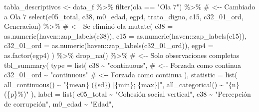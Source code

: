 \documentclass[
  spanish,
  a4paper,
  oneside]{scrbook}
\newenvironment{Shaded}{\begin{snugshade}}{\end{snugshade}}
\newcommand{\AttributeTok}[1]{\textcolor[rgb]{0.40,0.45,0.13}{#1}}
\newcommand{\CommentTok}[1]{\textcolor[rgb]{0.37,0.37,0.37}{#1}}
\newcommand{\FunctionTok}[1]{\textcolor[rgb]{0.28,0.35,0.67}{#1}}
\newcommand{\NormalTok}[1]{\textcolor[rgb]{0.00,0.23,0.31}{#1}}
\newcommand{\OtherTok}[1]{\textcolor[rgb]{0.00,0.23,0.31}{#1}}
\newcommand{\SpecialCharTok}[1]{\textcolor[rgb]{0.37,0.37,0.37}{#1}}
\newcommand{\StringTok}[1]{\textcolor[rgb]{0.13,0.47,0.30}{#1}}
\begin{document}
\begin{Shaded}
\begin{Highlighting}[]
\NormalTok{tabla\_descriptivos }\OtherTok{\textless{}{-}}\NormalTok{ data\_f }\SpecialCharTok{\%\textgreater{}\%} 
  \FunctionTok{filter}\NormalTok{(ola }\SpecialCharTok{==} \StringTok{"Ola 7"}\NormalTok{) }\SpecialCharTok{\%\textgreater{}\%}               \CommentTok{\# \textless{}{-}{-} Cambiado a Ola 7}
  \FunctionTok{select}\NormalTok{(c05\_total, c38, m0\_edad, egp4, trato\_digno,}
\NormalTok{         c15, c32\_01\_ord, Generacion) }\SpecialCharTok{\%\textgreater{}\%}  \CommentTok{\# \textless{}{-}{-} Se eliminó \textquotesingle{}ola\textquotesingle{}}
  \FunctionTok{mutate}\NormalTok{(}
    \AttributeTok{c38        =} \FunctionTok{as.numeric}\NormalTok{(haven}\SpecialCharTok{::}\FunctionTok{zap\_labels}\NormalTok{(c38)),}
    \AttributeTok{c15        =} \FunctionTok{as.numeric}\NormalTok{(haven}\SpecialCharTok{::}\FunctionTok{zap\_labels}\NormalTok{(c15)),}
    \AttributeTok{c32\_01\_ord =} \FunctionTok{as.numeric}\NormalTok{(haven}\SpecialCharTok{::}\FunctionTok{zap\_labels}\NormalTok{(c32\_01\_ord)),}
    \AttributeTok{egp4       =} \FunctionTok{as.factor}\NormalTok{(egp4)}
\NormalTok{  ) }\SpecialCharTok{\%\textgreater{}\%} 
  \FunctionTok{drop\_na}\NormalTok{() }\SpecialCharTok{\%\textgreater{}\%}                            \CommentTok{\# \textless{}{-}{-} Solo observaciones completas}
  \FunctionTok{tbl\_summary}\NormalTok{(}
    \AttributeTok{type =} \FunctionTok{list}\NormalTok{(}
\NormalTok{      c38        }\SpecialCharTok{\textasciitilde{}} \StringTok{"continuous"}\NormalTok{,           }\CommentTok{\# \textless{}{-}{-} Forzada como continua}
\NormalTok{      c32\_01\_ord }\SpecialCharTok{\textasciitilde{}} \StringTok{"continuous"}            \CommentTok{\# \textless{}{-}{-} Forzada como continua}
\NormalTok{    ),}
    \AttributeTok{statistic =} \FunctionTok{list}\NormalTok{(}
      \FunctionTok{all\_continuous}\NormalTok{()  }\SpecialCharTok{\textasciitilde{}} \StringTok{"\{mean\} (\{sd\}) [\{min\}; \{max\}]"}\NormalTok{,}
      \FunctionTok{all\_categorical}\NormalTok{() }\SpecialCharTok{\textasciitilde{}} \StringTok{"\{n\} (\{p\}\%)"}
\NormalTok{    ),}
    \AttributeTok{label =} \FunctionTok{list}\NormalTok{(}
\NormalTok{      c05\_total   }\SpecialCharTok{\textasciitilde{}} \StringTok{"Cohesión social vertical"}\NormalTok{,}
\NormalTok{      c38         }\SpecialCharTok{\textasciitilde{}} \StringTok{"Percepción de corrupción"}\NormalTok{,}
\NormalTok{      m0\_edad     }\SpecialCharTok{\textasciitilde{}} \StringTok{"Edad"}\NormalTok{,}

\end{Highlighting}
\end{Shaded}
\end{document}
